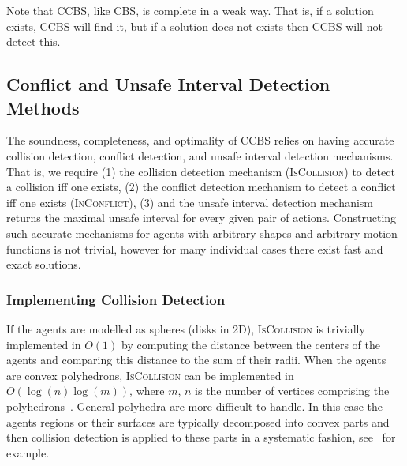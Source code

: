 \documentclass[review]{elsarticle}
\newcommand{\ccbs}{\ac{CCBS}\xspace}
\newcommand{\cbs}{\ac{CBS}\xspace}
\newcommand{\iscollision}{\textsc{IsCollision}\xspace}
\newcommand{\inconflict}{\textsc{InConflict}\xspace}
\begin{document}
Note that \ccbs, like \cbs, is complete in a weak way. That is, if a solution exists, \ccbs will find it, but if a solution does not exists then \ccbs will not detect this. 




\subsection{Conflict and Unsafe Interval Detection Methods}
\label{sec:conflict-and-unsafe-detection}


The soundness, completeness, and optimality of \ccbs relies on having accurate collision detection, conflict detection, and unsafe interval detection mechanisms. That is, we require (1) the collision detection mechanism (\iscollision) to detect a collision iff one exists, (2) the conflict detection mechanism to detect a conflict iff one exists (\inconflict), (3) and the unsafe interval detection mechanism returns the maximal unsafe interval for every given pair of actions. 
Constructing such accurate mechanisms for agents with arbitrary shapes and arbitrary motion-functions is not trivial, however for many individual cases there exist fast and exact solutions.

\subsubsection{Implementing Collision Detection}
If the agents are modelled as spheres (disks in 2D), \iscollision is trivially implemented in $O(1)$ by computing the distance between the centers of the agents and comparing this distance to the sum of their radii. When the agents are convex polyhedrons, \iscollision can be implemented in $O(\log(n) \log(m))$, where $m$, $n$ is the number of vertices comprising the polyhedrons~\cite{dobkin1990determining}. General polyhedra are more difficult to handle. In this case the agents regions or their surfaces are typically decomposed into convex parts and then collision detection is applied to these parts in a systematic fashion, see~\cite{gottschalk1996obbtree} for example.
\end{document}
